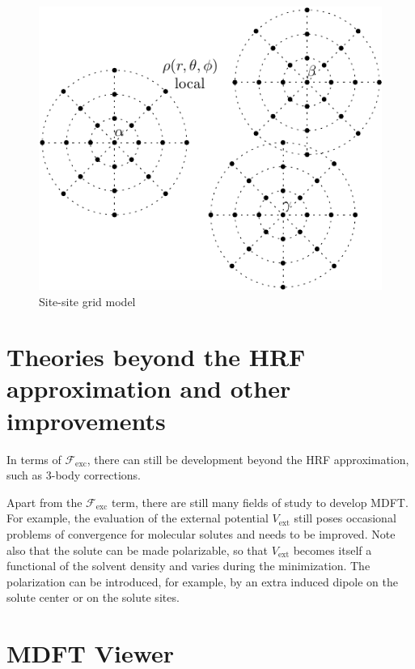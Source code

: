 \begin{figure}[h]
\begin{centering}
\includegraphics{_figure/site-site}
\par\end{centering}
\caption{Site-site grid model\label{fig:Site-site-grid-model}}
\end{figure}


\section{Theories beyond the HRF approximation and other improvements}

In terms of $\mathcal{F}_{\mathrm{exc}}$, there can still be development
beyond the \acs{HRF} approximation, such as 3-body corrections.

Apart from the $\mathcal{F}_{\mathrm{exc}}$ term, there are still
many fields of study to develop \acs{MDFT}. For example, the evaluation
of the external potential $V_{\mathrm{ext}}$ still poses occasional
problems of convergence for molecular solutes and needs to be improved.
Note also that the solute can be made polarizable, so that $V_{\mathrm{ext}}$
becomes itself a functional of the solvent density and varies during
the minimization. The polarization can be introduced, for example,
by an extra induced dipole on the solute center or on the solute sites.

\section{MDFT Viewer}

